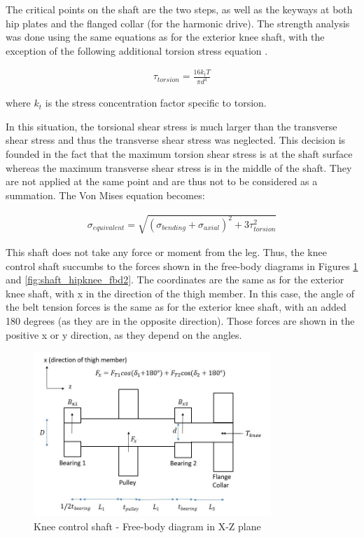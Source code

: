 The critical points on the shaft are the two steps, as well as the keyways at both hip plates and the flanged collar (for the harmonic drive). The strength analysis was done using the same equations as for the exterior knee shaft, with the exception of the following additional torsion stress equation \cite{juvinall_fundamentals_2012}.

\begin{gather}
    \tau_{torsion}=\frac{16k_tT}{\pi{}d^3} \label{eq:shaft_torsion_stress}
\end{gather}

where $k_t$ is the stress concentration factor specific to torsion.

In this situation, the torsional shear stress is much larger than the transverse shear stress and thus the transverse shear stress was neglected. This decision is founded in the fact that the maximum torsion shear stress is at the shaft surface whereas the maximum transverse shear stress is in the middle of the shaft. They are not applied at the same point and are thus not to be considered as a summation. The Von Mises equation becomes:

\begin{gather}
    \sigma_{equivalent}=\sqrt{(\sigma_{bending}+\sigma_{axial})^2+3\tau_{torsion}^2} \label{eq:shaft_vonmises}
\end{gather}


This shaft does not take any force or moment from the leg. Thus, the knee control shaft succumbs to the forces shown in the free-body diagrams in Figures \ref{fig:shaft_hipknee_fbd1} and \ref{fig:shaft_hipknee_fbd2}. The coordinates are the same as for the exterior knee shaft, with x in the direction of the thigh member. In this case, the angle of the belt tension forces is the same as for the exterior knee shaft, with an added 180 degrees (as they are in the opposite direction). Those forces are shown in the positive x or y direction, as they depend on the angles.

\begin{figure}
    \centering
    \includegraphics[width=0.8\textwidth]{4_Analysis/img/Shafts/ShaftHipKneeXZ.JPG}
    \caption{Knee control shaft - Free-body diagram in X-Z plane}
    \label{fig:shaft_hipknee_fbd1}
\end{figure}

